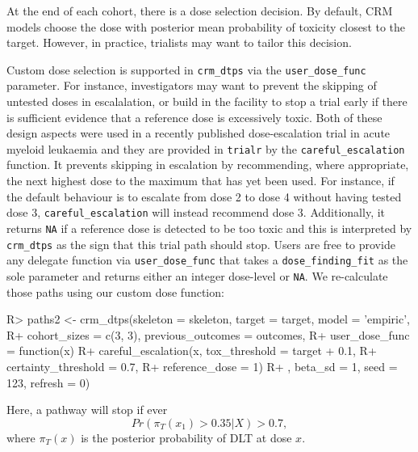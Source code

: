 \documentclass[article]{jss}
\begin{document}
At the end of each cohort, there is a dose selection decision. By
default, CRM models choose the dose with posterior mean probability of
toxicity closest to the target. However, in practice, trialists may want
to tailor this decision.

Custom dose selection is supported in \texttt{crm\_dtps} via the
\texttt{user\_dose\_func} parameter. For instance, investigators may
want to prevent the skipping of untested doses in escalalation, or build
in the facility to stop a trial early if there is sufficient evidence
that a reference dose is excessively toxic. Both of these design aspects
were used in a recently published dose-escalation trial in acute myeloid
leukaemia \citep{craddockCombinationLenalidomideAzacitidine2019} and
they are provided in \texttt{trialr} by the \texttt{careful\_escalation}
function. It prevents skipping in escalation by recommending, where
appropriate, the next highest dose to the maximum that has yet been
used. For instance, if the default behaviour is to escalate from dose 2
to dose 4 without having tested dose 3, \texttt{careful\_escalation}
will instead recommend dose 3. Additionally, it returns \texttt{NA} if a
reference dose is detected to be too toxic and this is interpreted by
\texttt{crm\_dtps} as the sign that this trial path should stop. Users
are free to provide any delegate function via \texttt{user\_dose\_func}
that takes a \texttt{dose\_finding\_fit} as the sole parameter and
returns either an integer dose-level or \texttt{NA}. We re-calculate
those paths using our custom dose function:

\begin{CodeChunk}

\begin{CodeInput}
R> paths2 <- crm_dtps(skeleton = skeleton, target = target, model = 'empiric',
R+                    cohort_sizes = c(3, 3), previous_outcomes = outcomes,
R+                    user_dose_func = function(x) {
R+                      careful_escalation(x, tox_threshold = target + 0.1, 
R+                                         certainty_threshold = 0.7,
R+                                         reference_dose = 1)
R+                    }, beta_sd = 1, seed = 123, refresh = 0)
\end{CodeInput}
\end{CodeChunk}

Here, a pathway will stop if ever \begin{equation}
Pr(\pi_T(x_1) > 0.35 | X) > 0.7,
\end{equation} where \(\pi_T(x)\) is the posterior probability of DLT at
dose \(x\).
\end{document}

